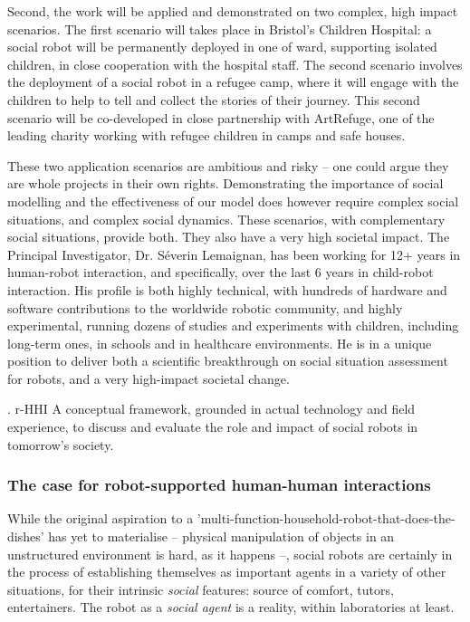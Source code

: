 \documentclass[]{article}
\begin{document}
Second, the work will be applied and demonstrated on two complex, high impact
scenarios. The first scenario will takes place in Bristol's Children
Hospital: a social robot will be permanently deployed in one of ward, supporting
isolated children, in close cooperation with the hospital staff. The second
scenario involves the deployment of a social robot in a refugee camp, where it
will engage with the children to help to tell and collect the stories of their
journey. This second scenario will be co-developed in close partnership with
ArtRefuge, one of the leading charity working with refugee children in camps and
safe houses.

These two application scenarios are ambitious and risky -- one could argue they
are whole projects in their own rights. Demonstrating the importance of social
modelling and the effectiveness of our model does however
require complex social situations, and complex social dynamics. These scenarios,
with complementary social situations, provide both. They also have a very high
societal impact. The Principal Investigator, Dr. Séverin Lemaignan, has been
working for 12+ years in human-robot interaction, and specifically, over the
last 6 years in child-robot interaction. His profile is both highly technical,
with hundreds of hardware and software contributions to the worldwide robotic community,
and highly experimental, running dozens of studies and experiments with children, including
long-term ones, in schools and in healthcare environments. He is in a unique
position to deliver both a scientific breakthrough on social situation
assessment for robots, and a very high-impact societal change.




. r-HHI A conceptual framework, grounded in
actual technology and field experience, to discuss and evaluate the role and
impact of social robots in tomorrow's society.








\subsubsection{The case for robot-supported human-human interactions}

While the original aspiration to a
'multi-function-household-robot-that-does-the-dishes' has yet to materialise --
physical manipulation of objects in an unstructured environment is hard, as it
happens --, social robots are certainly in the process of establishing
themselves as important agents in a variety of other situations, for their
intrinsic \emph{social} features: source of comfort, tutors, entertainers. The
robot as a \emph{social agent} is a reality, within laboratories at least.
\end{document}
